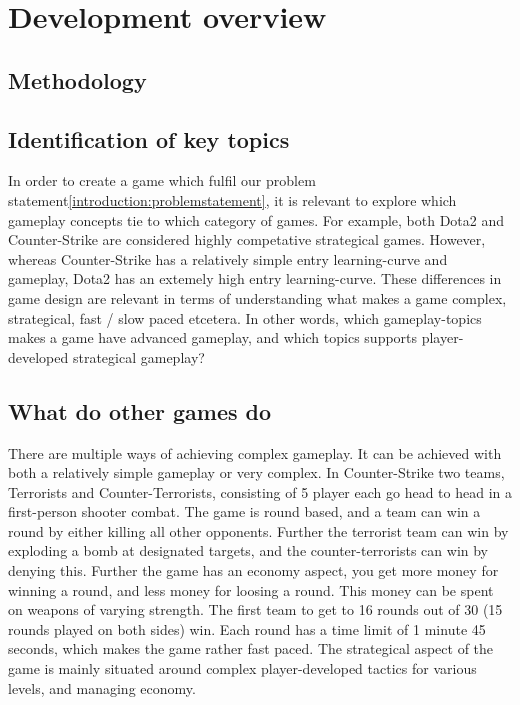 \section{Development overview}
\subsection{Methodology}
\subsection{Identification of key topics}
In order to create a game which fulfil our problem statement\ref{introduction:problemstatement}, it is relevant to explore which gameplay concepts tie to which category of games. For example, both Dota2\cite{dota2} and Counter-Strike\cite{counterstrike} are considered highly competative strategical games. However, whereas Counter-Strike has a relatively simple entry learning-curve and gameplay, Dota2 has an extemely high entry learning-curve. These differences in game design are relevant in terms of understanding what makes a game complex, strategical, fast / slow paced etcetera.
In other words, which gameplay-topics makes a game have advanced gameplay, and which topics supports player-developed strategical gameplay?

\subsection{What do other games do}
There are multiple ways of achieving complex gameplay. It can be achieved with both a relatively simple gameplay or very complex. In Counter-Strike two teams, Terrorists and Counter-Terrorists, consisting of 5 player each go head to head in a first-person shooter combat. The game is round based, and a team can win a round by either killing all other opponents. Further the terrorist team can win by exploding a bomb at designated targets, and the counter-terrorists can win by denying this. Further the game has an economy aspect, you get more money for winning a round, and less money for loosing a round. This money can be spent on weapons of varying strength. 
The first team to get to 16 rounds out of 30 (15 rounds played on both sides) win. Each round has a time limit of 1 minute 45 seconds, which makes the game rather fast paced. 
The strategical aspect of the game is mainly situated around complex player-developed tactics for various levels, and managing economy. 


